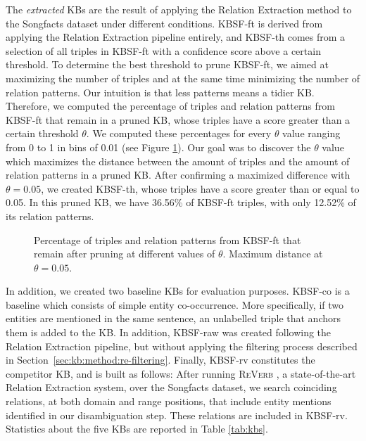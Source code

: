 The \textit{extracted} KBs are the result of applying the Relation Extraction method to the Songfacts dataset under different conditions. \textsc{KBSF}-ft is derived from applying the Relation Extraction pipeline entirely, and \textsc{KBSF}-th comes from a selection of all triples in \textsc{KBSF}-ft with a confidence score above a certain threshold. To determine the best threshold to prune \textsc{KBSF}-ft, we aimed at maximizing the number of triples and at the same time minimizing the number of relation patterns. Our intuition is that less patterns means a tidier KB. Therefore, we computed the percentage of triples and relation patterns from \textsc{KBSF}-ft that remain in a pruned KB, whose triples have a score greater than a certain threshold $\theta$. We computed these percentages for every $\theta$ value ranging from 0 to 1 in bins of 0.01 (see Figure \ref{fig:kb:th}). Our goal was to discover the $\theta$ value which maximizes the distance between the amount of triples and the amount of relation patterns in a pruned KB. After confirming a maximized difference with $\theta=0.05$, we created \textsc{KBSF}-th, whose triples have a score greater than or equal to 0.05. In this pruned KB, we have 36.56\% of \textsc{KBSF}-ft triples, with only 12.52\% of its relation patterns.

\begin{figure}[!htp]
\centerline{}
\caption{Percentage of triples and relation patterns from \textsc{KBSF}-ft that remain after pruning at different values of $\theta$. Maximum distance at $\theta=0.05$.}
\label{fig:kb:th}
\end{figure}

In addition, we created two baseline KBs for evaluation purposes. \textsc{KBSF}-co is a baseline which consists of simple entity co-occurrence. More specifically, if two entities are mentioned in the same sentence, an unlabelled triple that anchors them is added to the KB. In addition, \textsc{KBSF}-raw was created following the Relation Extraction pipeline, but without applying the filtering process described in Section~\ref{sec:kb:method:re-filtering}. Finally, \textsc{KBSF}-rv constitutes the competitor KB, and is built as follows: After running \textsc{ReVerb} \citep{Fader2011}, a state-of-the-art Relation Extraction system, over the Songfacts dataset, we search coinciding relations, at both domain and range positions, that include entity mentions identified in our disambiguation step. These relations are included in KBSF-rv. Statistics about the five KBs are reported in Table \ref{tab:kbs}.

